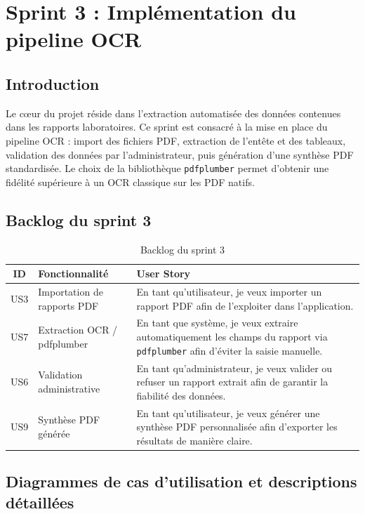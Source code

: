 \chapter{Sprint 3 : Implémentation du pipeline OCR}

\section*{Introduction}
Le c\oe ur du projet réside dans l'extraction automatisée des données contenues dans
les rapports laboratoires. Ce sprint est consacré à la mise en place du pipeline OCR :
import des fichiers PDF, extraction de l'entête et des tableaux, validation des
données par l'administrateur, puis génération d'une synthèse PDF standardisée. Le
choix de la bibliothèque \texttt{pdfplumber} permet d'obtenir une fidélité supérieure
à un OCR classique sur les PDF natifs.

\section{Backlog du sprint 3}
\begin{table}[h!]
\centering
\caption{Backlog du sprint 3}
\label{tab:backlog-sprint3}
\renewcommand{\arraystretch}{1.3}
\begin{tabularx}{\textwidth}{|c|l|X|}
\hline
\textbf{ID} & \textbf{Fonctionnalité} & \textbf{User Story} \\ \hline
US3 & Importation de rapports PDF &
En tant qu'utilisateur, je veux importer un rapport PDF afin de l'exploiter dans
l'application. \\ \hline
US7 & Extraction OCR / pdfplumber &
En tant que système, je veux extraire automatiquement les champs du rapport via
\texttt{pdfplumber} afin d'éviter la saisie manuelle. \\ \hline
US6 & Validation administrative &
En tant qu'administrateur, je veux valider ou refuser un rapport extrait afin de
garantir la fiabilité des données. \\ \hline
US9 & Synthèse PDF générée &
En tant qu'utilisateur, je veux générer une synthèse PDF personnalisée afin
d'exporter les résultats de manière claire. \\ \hline
\end{tabularx}
\end{table}

\section{Diagrammes de cas d'utilisation et descriptions détaillées}

